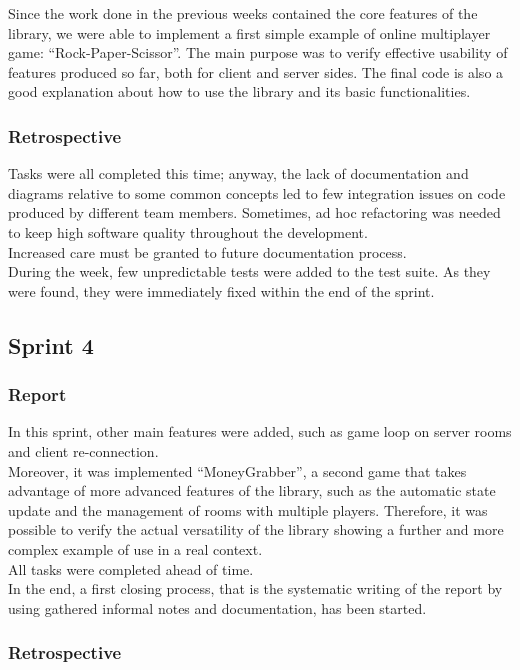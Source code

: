 Since the work done in the previous weeks contained the core features of the library, we were able to implement a first simple example of online multiplayer game: ``Rock-Paper-Scissor''. 
The main purpose was to verify effective usability of features produced so far, both for client and server sides.
The final code is also a good explanation about how to use the library and its basic functionalities.


\subsubsection{Retrospective}
Tasks were all completed this time; anyway, the lack of documentation and diagrams relative to some common concepts led to few integration issues on code produced by different team members. Sometimes, ad hoc refactoring was needed to keep high software quality throughout the development.
\\
Increased care must be granted to future documentation process.
\\
During the week, few unpredictable tests were added to the test suite.
As they were found, they were immediately fixed within the end of the sprint.




\subsection{Sprint 4}
\subsubsection{Report}
In this sprint, other main features were added, such as game loop on server rooms and client re-connection.
\\
Moreover, it was implemented ``MoneyGrabber'', a second game that takes advantage of more advanced features of the library, such as the automatic state update and the management of rooms with multiple players.
Therefore, it was possible to verify the actual versatility of the library showing a further and more complex example of use in a real context.
\\
All tasks were completed ahead of time.
\\
In the end, a first closing process, that is the systematic writing of the report by using gathered informal notes and documentation, has been started.

\subsubsection{Retrospective}

